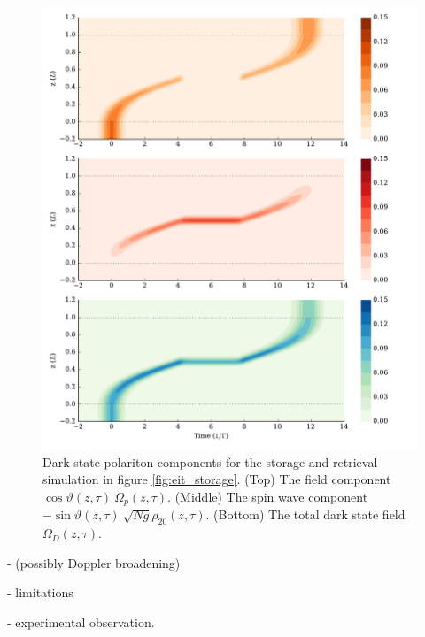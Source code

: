     \begin{figure}[]
      \includegraphics[width=\linewidth]
        {figs/04_polaritons/pls_p0_2pi_t1_Ng5e3_c10_gaussian_w0_5_storage_5_fig4.pdf}
      \caption{
      Dark state polariton components for the storage and retrieval simulation
      in figure \ref{fig:eit_storage}. (Top) The field component
      $\cos{\vartheta}(z, \tau)~\Omega_p(z, \tau)$. (Middle) The spin wave
      component $-\sin{\vartheta}(z, \tau) ~ \sqrt{Ng} \rho_{20}(z, \tau)$.
      (Bottom) The total dark state field $\Omega_D(z,\tau)$.
      }
      \label{fig:dark_state_components}
    \end{figure}


  - (possibly Doppler broadening)

  - limitations

  - experimental observation.
